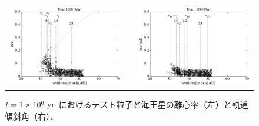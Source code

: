 \documentclass[11pt,a4paper,oneside,onecolumn]{jreport}
\begin{document}
\begin{figure}[H]
\begin{tabular}{ccc}
\begin{minipage}[t]{0.45\hsize}
\centering
\includegraphics[width=8cm]{./image/kuiper_ecc_1Myr.pdf}
\end{minipage} &
\begin{minipage}[t]{0.1\hsize}
\end{minipage} &
\begin{minipage}[t]{0.45\hsize}
\centering
\includegraphics[width=8cm]{./image/kuiper_inc_1Myr.pdf}
\end{minipage}\\
%
\end{tabular}
\caption{$t = 1 \times 10^6\ {\rm yr}$ におけるテスト粒子と海王星の離心率（左）と軌道傾斜角（右）．\label{fig:kuiper_ecc_inc_1Myr}}
\end{figure}
\end{document}
